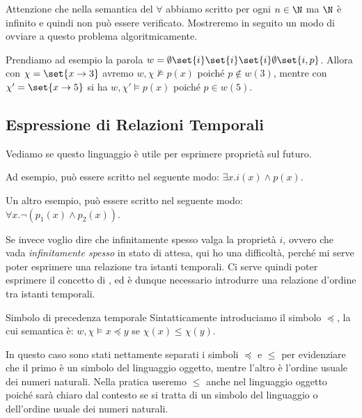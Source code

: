 \begin{note}{}
  Attenzione che nella semantica del \(\forall\) abbiamo scritto per ogni \(n\in\N\) ma \(\N\) è infinito e quindi non può essere verificato. Mostreremo in seguito un modo di ovviare a questo problema algoritmicamente.
\end{note}

\begin{example}{}
  Prendiamo ad esempio la parola \(w = \emptyset \set{i} \set{i} \set{i} \emptyset \set{i,p}\). Allora con \(\chi = \set{x \to 3}\) avremo \(w,\chi \not\models p(x)\) poiché \(p \not\in w(3)\), mentre con \(\chi' = \set{x \to 5}\) si ha \(w,\chi' \models p(x)\) poiché \(p \in w(5)\).
\end{example}


\subsection{Espressione di Relazioni Temporali}

Vediamo se questo linguaggio è utile per esprimere proprietà sul futuro.

Ad esempio,  può essere scritto nel seguente modo: \(\exists x. i(x) \land p(x)\).

Un altro esempio,  può essere scritto nel seguente modo: \(\forall x. \neg (p_1(x) \land p_2(x))\).

Se invece voglio dire che infinitamente spesso valga la proprietà \(i\), ovvero che vada \textit{infinitamente spesso} in stato di attesa, qui ho una difficoltà, perché mi serve poter esprimere una relazione tra istanti temporali.
Ci serve quindi poter esprimere il concetto di , ed è dunque necessario introdurre una relazione d'ordine tra istanti temporali.

\begin{definition}{Simbolo di precedenza temporale}
  Sintatticamente introduciamo il simbolo \(\preceq\), la cui semantica è:
  \(w,\chi \models x\preceq y\) se \(\chi(x) \leq \chi(y)\).
\end{definition}

\begin{note}{}
  In questo caso sono stati nettamente separati i simboli \(\preceq\) e \(\leq\) per evidenziare che il primo è un simbolo del linguaggio oggetto, mentre l'altro è l'ordine usuale dei numeri naturali.
  Nella pratica useremo \(\leq\) anche nel linguaggio oggetto poiché sarà chiaro dal contesto se si tratta di un simbolo del linguaggio o dell'ordine usuale dei numeri naturali.
\end{note}

